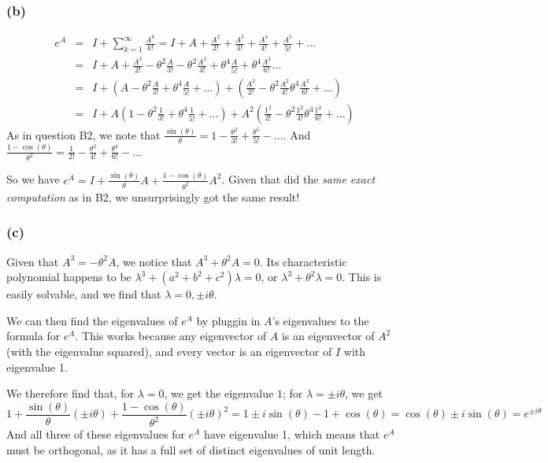 \documentclass{article}
\begin{document}
\subsubsection{(b)}
\begin{eqnarray*}
  e^A &=&  I + \sum_{k=1}^\infty \frac{A^k}{k!} = 
  I + A + \frac{A^2}{2!} + \frac{A^3}{3!} + \frac{A^4}{4!} + \frac{A^5}{5!} + \dots \\
  &=& I + A + \frac{A^2}{2!} -\theta^2 \frac{A}{3!} -\theta^2 \frac{A^2}{4!} + \theta^4 \frac{A}{5!} +  \theta^4 \frac{A^2}{6!} \dots \\
  &=& I + \left(A - \theta^2 \frac{A}{3!} + \theta^4 \frac{A}{5!} + \dots \right) + \left( \frac{A^2}{2!} - \theta^2 \frac{A^2}{4!}  \theta^4 \frac{A^2}{6!} + \dots \right)\\
  &=& I + A\left(1 - \theta^2 \frac{1}{3!} + \theta^4 \frac{1}{5!} + \dots \right) + A^2\left( \frac{1^2}{2!} - \theta^2 \frac{1^2}{4!}  \theta^4 \frac{1^2}{6!} + \dots \right)
 \end{eqnarray*}
 As in question B2, we note that 
$\frac{\sin(\theta)}{\theta} = 1 - \frac{\theta^2}{3!} + \frac{\theta^5}{5!} - \dots $.
And
$\frac{1 - \cos(\theta)}{\theta^2} = \frac{1}{2!} - \frac{\theta^2}{4!} + \frac{\theta^4}{6!} - \dots $

So we have $e^A = I + \frac{\sin(\theta)}{\theta}A + \frac{1-\cos(\theta)}{\theta^2}A^2$.
Given that did the \textsl{same exact computation} as in B2, we unsurprisingly got the same result!

\subsubsection{(c)}
Given that $A^3 = -\theta^2A$, we notice that $A^3 + \theta^2A = 0$.
Its characteristic polynomial happens to be $\lambda^3 + (a^2 + b^2 + c^2)\lambda = 0$, or $\lambda^3 + \theta^2\lambda = 0$.
This is easily solvable, and we find that $\lambda = 0, \pm i\theta$.

We can then find the eigenvalues of $e^A$ by pluggin in $A$'s eigenvalues to the formula for $e^A$.
This works because any eigenvector of $A$ is an eigenvector of $A^2$ (with the eigenvalue squared), and every vector is an eigenvector of $I$ with eigenvalue 1.

We therefore find that, for $\lambda=0$, we get the eigenvalue $1$;
for $\lambda=\pm i\theta$, we get
\[1 + \frac{\sin(\theta)}{\theta}(\pm i\theta) + \frac{1-\cos(\theta)}{\theta^2}(\pm i\theta)^2
= 1 \pm i\sin(\theta) - 1 + \cos(\theta) = \cos(\theta) \pm i\sin(\theta)
= e^{\pm i\theta}\]
And all three of these eigenvalues for $e^A$ have eigenvalue 1, which means that $e^A$ must be orthogonal, as it has a full set of distinct eigenvalues of unit length.
\end{document}

